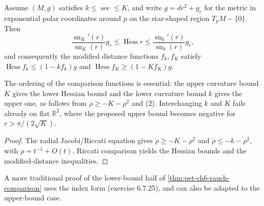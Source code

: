 \begin{theorem}
  \label{thm:pet-ch6-rauch-comparison}

  Assume $(M,g)$ satisfies $k\le\sec\le K$, and write $g=dr^2+g_r$ for the
  metric in exponential polar coordinates around $p$ on the star-shaped
  region $T_pM-\{0\}$. Then
  \[
    \frac{\operatorname{sn}_K'(r)}{\operatorname{sn}_K(r)}g_r\le\operatorname{Hess}r\le\frac{\operatorname{sn}_k'(r)}{\operatorname{sn}_k(r)}g_r,
  \]
  and consequently the modified distance functions $f_k,f_K$ satisfy
  $\operatorname{Hess}f_k\le(1-kf_k)g$ and $\operatorname{Hess}f_K\ge(1-Kf_K)g$.

  The ordering of the comparison functions is essential: the upper curvature
  bound $K$ gives the lower Hessian bound and the lower curvature bound $k$ gives
  the upper one, as follows from
  $\dot\rho\ge-K-\rho^2$ and
  (2). Interchanging $k$ and $K$
  fails already on flat $\mathbb{R}^2$, where the proposed upper bound becomes
  negative for $r>\pi/(2\sqrt K)$.
\end{theorem}
\begin{proof}
  \sketch
  The radial Jacobi/Riccati equation gives \(\dot\rho\ge-K-\rho^2\) and \(\dot\rho\le-k-\rho^2\), with \(\rho=t^{-1}+O(t)\). Riccati comparison yields the Hessian bounds and the modified-distance inequalities.
\end{proof}

\begin{remark}
  \label{rem:pet-ch6-index-form-remark}


  A more traditional proof of the lower-bound half of
  \cref{thm:pet-ch6-rauch-comparison} uses the index form (exercise 6.7.25),
  and can also be adapted to the upper-bound case.
\end{remark}

